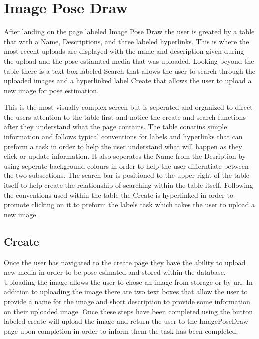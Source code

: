 \documentclass{scrreprt}
\begin{document}
\section{Image Pose Draw}
After landing on the page labeled Image Pose Draw the user is greated by a table that with a Name, Descriptions, and three labeled hyperlinks. This is where the most recent uploads are displayed with the name and description given during the upload and the pose estiamted media that was uploaded. Looking beyond the table there is a text box labeled Search that allows the user to search through the uploaded images and a hyperlinked label Create that allows the user to upload a new image for pose estimation.

This is the most visually complex screen but is seperated and organized to direct the users attention to the table first and notice the create and search functions after they understand what the page contains. The table conatins simple information and follows typical conventions for labels and hyperlinks that can preform a task in order to help the user understand what will happen as they click or update information. It also seperates the Name from the Desription by using seperate background colours in order to help the user differntiate between the two subsections. The search bar is positioned to the upper right of the table itself to help create the relationship of searching within the table itself. Following the conventions used within the table the Create is hyperlinked in order to promote clicking on it to preform the labels task which takes the user to upload a new image. 

\subsection{Create}
Once the user has navigated to the create page they have the ability to upload new media in order to be pose esimated and stored within the database. Uploading the image allows the user to chose an image from storage or by url. In addition to uploading the image there are two text boxes that allow the user to provide a name for the image and short description to provide some information on their uploaded image. Once these steps have been completed using the button labeled create will upload the image and return the user to the ImagePoseDraw page upon completion in order to inform them the task has been completed.
\end{document}

